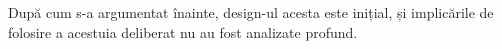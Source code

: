 \documentclass[a4paper,12pt]{report}
\begin{document}
După cum s-a argumentat înainte, design-ul acesta este inițial,
și implicările de folosire a acestuia deliberat nu au fost analizate profund.






\newpage
{}





\appendix

\renewcommand{\thechapter}{\arabic{chapter}}


\setcounter{chapter}{1}

\end{document}
